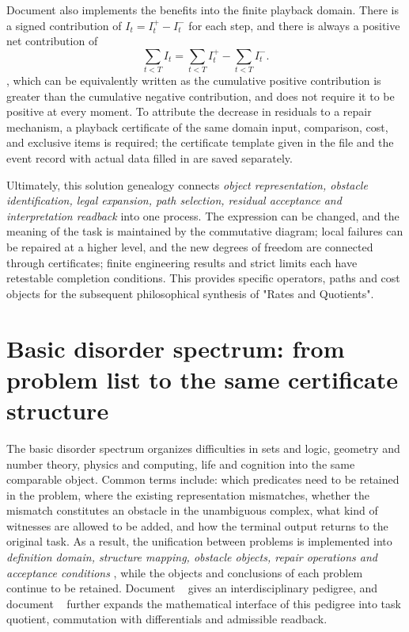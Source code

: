 \documentclass[11pt,a4paper]{article}
\theoremstyle{plain}
\theoremstyle{definition}
\theoremstyle{remark}
\begin{document}
\begin{CJK*}
Document \cite{S36} also implements the benefits into the finite playback domain. There is a signed contribution of $I_t=I_t^+-I_t^-$ for each step, and there is always a positive net contribution of \[
 \sum_{t<T}I_t=\sum_{t<T}I_t^+-\sum_{t<T}I_t^-.
\], which can be equivalently written as the cumulative positive contribution is greater than the cumulative negative contribution, and does not require it to be positive at every moment. To attribute the decrease in residuals to a repair mechanism, a playback certificate of the same domain input, comparison, cost, and exclusive items is required; the certificate template given in the file and the event record with actual data filled in are saved separately.

Ultimately, this solution genealogy connects \emph { object representation, obstacle identification, legal expansion, path selection, residual acceptance and interpretation readback } into one process. The expression can be changed, and the meaning of the task is maintained by the commutative diagram; local failures can be repaired at a higher level, and the new degrees of freedom are connected through certificates; finite engineering results and strict limits each have retestable completion conditions. This provides specific operators, paths and cost objects for the subsequent philosophical synthesis of "Rates and Quotients".

\section { Basic disorder spectrum: from problem list to the same certificate structure }\label{pc:spectrum}


The basic disorder spectrum organizes difficulties in sets and logic, geometry and number theory, physics and computing, life and cognition into the same comparable object. Common terms include: which predicates need to be retained in the problem, where the existing representation mismatches, whether the mismatch constitutes an obstacle in the unambiguous complex, what kind of witnesses are allowed to be added, and how the terminal output returns to the original task. As a result, the unification between problems is implemented into \emph { definition domain, structure mapping, obstacle objects, repair operations and acceptance conditions }, while the objects and conclusions of each problem continue to be retained. Document ~ \cite{S37} gives an interdisciplinary pedigree, and document ~ \cite{S38} further expands the mathematical interface of this pedigree into task quotient, commutation with differentials and admissible readback.


\end{CJK*}
\end{document}

